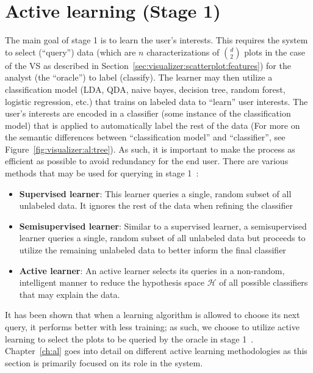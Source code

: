 \section{Active learning (Stage 1)}
\label{sec:visualizer:al}

The main goal of stage 1 is to learn the user's interests. This requires the 
system to select (``query'') data (which are $n$ characterizations of $d\choose 
2$ plots in the case of the VS as described in 
Section~\ref{sec:visualizer:scatterplot:features}) for the analyst (the 
``oracle'') to label (classify). The learner may then utilize a classification 
model (LDA, QDA, naive bayes, decision tree, random forest, logistic 
regression, etc.) that trains on labeled data to ``learn'' user interests. The 
user's interests are encoded in a classifier (some instance of the 
classification model) that is applied to automatically label the rest of the 
data (For more on the 
semantic differences between ``classification model'' and ``classifier'', see 
Figure~\ref{fig:visualizer:al:tree}). As such, it is important to make the 
process as efficient as possible to avoid redundancy for the end user. There 
are various methods that may be used for querying in stage 
1~\cite{dasgupta2011}:

\tablespacing
\begin{itemize}
	\item \textbf{Supervised learner}: This learner queries a single, random 
	subset of all unlabeled data. It ignores the rest of the data when refining 
	the classifier
	\item \textbf{Semisupervised learner}: Similar to a supervised learner, a 
	semisupervised learner queries a single, random subset of all 
	unlabeled data but proceeds to utilize the remaining unlabeled data to 
	better inform the final classifier
	\item \textbf{Active learner}: An active learner selects its queries in a 
	non-random, intelligent manner to reduce the hypothesis space $\mathcal{H}$ 
	of all possible classifiers that may explain the data.
\end{itemize}
\bodyspacing

It has been 
shown that when a learning algorithm is allowed to choose its next query, it 
performs better with less training; as such, we choose to utilize active 
learning to select the plots to be queried by the oracle in stage 
1~\cite{settles2010}. Chapter~\ref{ch:al} goes into detail on different active 
learning methodologies as this section is primarily focused on its role in the 
system.


